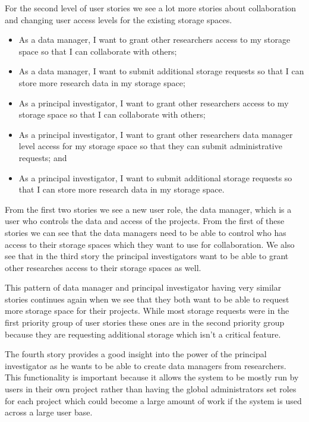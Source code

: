 \documentclass[a4paper,titlepage,12pt]{article}
\begin{document}
For the second level of user stories we see a lot more stories about
collaboration and changing user access levels for the existing storage spaces.

\begin{itemize}
	\item As a data manager, I want to grant other researchers access to my
	      storage space so that I can collaborate with others;
	\item As a data manager, I want to submit additional storage requests
	      so that I can store more research data in my storage space;
	\item As a principal investigator, I want to grant other researchers
	      access to my storage space so that I can collaborate with others;
	\item As a principal investigator, I want to grant other researchers
	      data manager level access for my storage space so that they can
	      submit administrative requests; and
	\item As a principal investigator, I want to submit additional storage
	      requests so that I can store more research data in my storage
	      space.
\end{itemize}

From the first two stories we see a new user role, the data manager, which is a
user who controls the data and access of the projects. From the first of these
stories we can see that the data managers need to be able to control who has
access to their storage spaces which they want to use for collaboration. We
also see that in the third story the principal investigators want to be able to
grant other researches access to their storage spaces as well.

This pattern of data manager and principal investigator having very similar
stories continues again when we see that they both want to be able to request
more storage space for their projects. While most storage requests were in the
first priority group of user stories these ones are in the second priority
group because they are requesting additional storage which isn't a critical
feature.

The fourth story provides a good insight into the power of the principal
investigator as he wants to be able to create data managers from researchers.
This functionality is important because it allows the system to be mostly run
by users in their own project rather than having the global administrators set
roles for each project which could become a large amount of work if the system
is used across a large user base.
\end{document}
